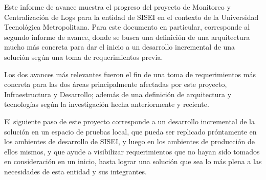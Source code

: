 \documentclass[
	spanish, %
	letterpaper, oneside
]{article}
\begin{document}
\templatePortrait

\templatePagecfg

\begin{abstractd}

	Este informe de avance muestra el progreso del proyecto de Monitoreo y Centralización de Logs para la entidad de SISEI en el contexto de la Universidad Tecnológica Metropolitana. Para este documento en particular, corresponde al segundo informe de avance, donde se busca una definición de una arquitectura mucho más concreta para dar el inicio a un desarrollo incremental de una solución según una toma de requerimientos previa.

	Los dos avances más relevantes fueron el fin de una toma de requerimientos más concreta para las dos áreas principalmente afectadas por este proyecto, Infraestructura y Desarrollo; además de una definición de arquitectura y tecnologías según la investigación hecha anteriormente y reciente.

	El siguiente paso de este proyecto corresponde a un desarrollo incremental de la solución en un espacio de pruebas local, que pueda ser replicado próntamente en los ambientes de desarrollo de SISEI, y luego en los ambientes de producción de ellos mismos, y que ayude a visibilizar requerimientos que no hayan sido tomados en consideración en un inicio, hasta lograr una solución que sea lo más plena a las necesidades de esta entidad y sus integrantes.

\end{abstractd}

\templateIndex

\templateFinalcfg









% 
% 



\nocite{alberdi_2020}
\nocite{sharif_2022}
\nocite{schwaber2020scrum}
\nocite{Anonymous}



\end{document}
